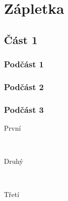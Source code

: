 \documentclass[12pt]{article} %
\begin{document}

\section{Zápletka} %

\lipsum[5] %


\subsection{Část 1} %

\subsubsection{Podčást 1} %

\lipsum[6] %


\subsubsection{Podčást 2} %



\subsubsection{Podčást  3} %

\begin{description} %

\item[První] \hfill \\
\lipsum[9] %

\item[Druhý] \hfill \\
\lipsum[10] %

\item[Třetí] \hfill \\
\lipsum[11] %

\end{description} 

\end{document}
